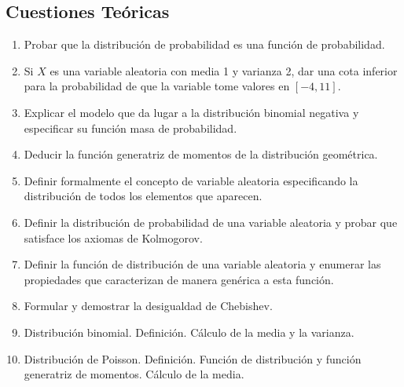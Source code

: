 \documentclass[fleqn]{article}
\begin{document}
\begin{enumerate}
                \subsection{Cuestiones Teóricas}

                        \begin{enumerate}
                                \item Probar que la distribución de probabilidad es una función de probabilidad.
                                \item Si $X$ es una variable aleatoria con media 1 y varianza 2, dar una cota inferior para la probabilidad
                                        de que la variable tome valores en $[-4, 11]$.
                                \item Explicar el modelo que da lugar a la distribución binomial negativa y especificar su función masa de probabilidad.
                                \item Deducir la función generatriz de momentos de la distribución geométrica.
                                \item Definir formalmente el concepto de variable aleatoria especificando la distribución de todos los elementos
                                        que aparecen.
                                \item Definir la distribución de probabilidad de una variable aleatoria y probar que satisface los axiomas de Kolmogorov.
                                \item Definir la función de distribución de una variable aleatoria y enumerar las propiedades que caracterizan de manera
                                        genérica a esta función.
                                \item Formular y demostrar la desigualdad de Chebishev.
                                \item Distribución binomial. Definición. Cálculo de la media y la varianza.
                                \item Distribución de Poisson. Definición. Función de distribución y función generatriz de momentos. Cálculo de la media.
                                
                                        
                                
                        \end{enumerate}


                \newpage


\end{enumerate}
\end{document}
